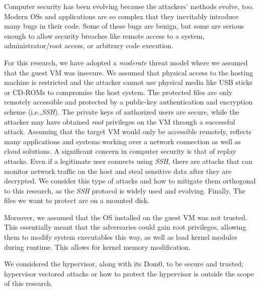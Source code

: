 Computer security has been evolving because the attackers' methods evolve, too. Modern \acp{OS} and applications are so complex that they inevitably introduce many bugs in their code. Some of these bugs are benign, but some are serious enough to allow security breaches like remote access to a system, administrator/root access, or arbitrary code execution.

\par For this research, we have adopted a \emph{moderate} threat model where we assumed that the guest \ac{VM} was insecure. We assumed that physical access to the hosting machine is restricted and the attacker cannot use physical media like USB sticks or CD-ROMs to compromise the host system. The protected files are only remotely accessible and protected  by  a  public-key  authentication  and  encryption scheme (i.e.,\emph{SSH}). The  private  keys  of  authorized  users  are  secure, while the attacker may have obtained \emph{root} privileges on the \ac{VM} through a successful attack. Assuming that the target \ac{VM} would only be accessible remotely, reflects many applications and systems working over a network connection as well as cloud solutions. A significant  concern  in  computer security is that of replay attacks. Even if a legitimate user connects using \emph{SSH}, there are attacks that can monitor  network  traffic  on  the  host  and  steal  sensitive data after they are decrypted. We consider this type of attacks and how to mitigate them orthogonal to this research, as the \emph{SSH} protocol is widely used and evolving. Finally, The files we want to protect are on a mounted disk.

\par Moreover, we assumed that the \ac{OS} installed on the guest \ac{VM} was not trusted. This essentially meant that the adversaries could gain root privileges, allowing them to modify system executables this way, as well as load kernel modules during runtime. This allows for kernel memory modification.

\par We considered the hypervisor, along with its Dom0, to be secure and trusted; hypervisor vectored attacks or how to protect the hypervisor is outside the scope of this research.

